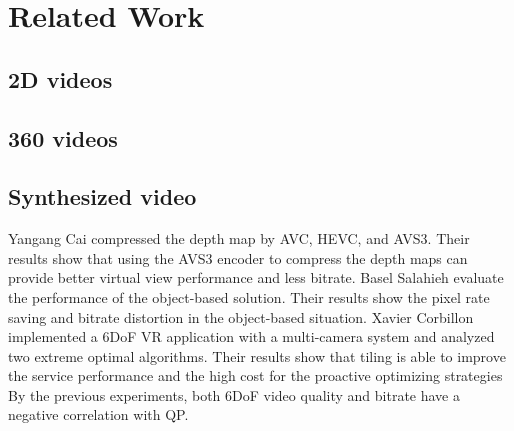 \section{Related Work} \label{sec:related}

\subsection{2D videos}

\subsection{360 videos}

\subsection{Synthesized video}
Yangang Cai \cite{CRQP21} compressed the depth map by AVC, HEVC, and AVS3. Their results show that using the AVS3 encoder to compress the depth maps can provide better virtual view performance and less bitrate.
Basel Salahieh \cite{BWJ21} evaluate the performance of the object-based solution. Their results show the pixel rate saving and bitrate distortion in the object-based situation.
Xavier Corbillon \cite{CSSF18} implemented a 6DoF VR application with a multi-camera system and analyzed two extreme optimal algorithms. Their results show that tiling is able to improve the service performance and the high cost for the proactive optimizing strategies
By the previous experiments, both 6DoF video quality and bitrate have a negative correlation with QP.